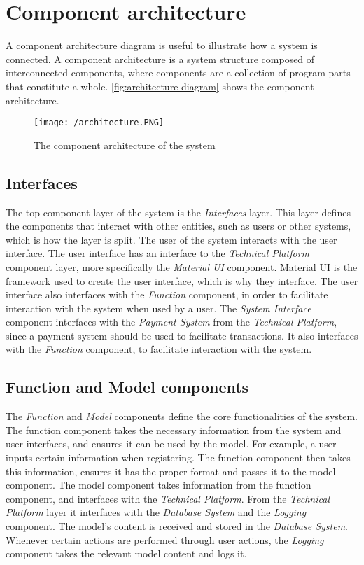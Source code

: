 \section{Component architecture}
A component architecture diagram is useful to illustrate how a system is connected.
A component architecture is a system structure composed of interconnected components, where components are a collection of program parts that constitute a whole\cite{OOAD}.
\autoref{fig:architecture-diagram} shows the component architecture.

\begin{figure}[H]
    \texttt{[image: /architecture.PNG]}
    \caption{The component architecture of the system}
    \label{fig:architecture-diagram}
\end{figure}

\subsection{Interfaces}
The top component layer of the system is the \textit{Interfaces} layer.
This layer defines the components that interact with other entities, such as users or other systems, which is how the layer is split.
The user of the system interacts with the user interface.
The user interface has an interface to the \textit{Technical Platform} component layer, more specifically the \textit{Material UI} component.
Material UI is the framework used to create the user interface, which is why they interface.
The user interface also interfaces with the \textit{Function} component, in order to facilitate interaction with the system when used by a user. 
The \textit{System Interface} component interfaces with the \textit{Payment System} from the \textit{Technical Platform}, since a payment system should be used to facilitate transactions.
It also interfaces with the \textit{Function} component, to facilitate interaction with the system.

\subsection{Function and Model components}
The \textit{Function} and \textit{Model} components define the core functionalities of the system.
The function component takes the necessary information from the system and user interfaces, and ensures it can be used by the model.
For example, a user inputs certain information when registering. 
The function component then takes this information, ensures it has the proper format and passes it to the model component.
The model component takes information from the function component, and interfaces with the \textit{Technical Platform}.
From the \textit{Technical Platform} layer it interfaces with the \textit{Database System} and the \textit{Logging} component.
The model's content is received and stored in the \textit{Database System}.
Whenever certain actions are performed through user actions, the \textit{Logging} component takes the relevant model content and logs it.

